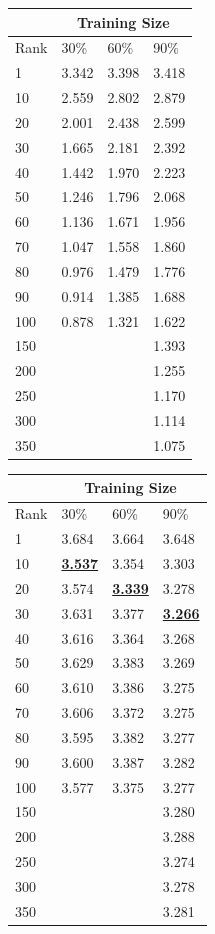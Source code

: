 \documentclass[12pt]{article}
\begin{document}
\begin{center}
        \begin{tabular}{|l || l| l| l|}
          \hline
          &\multicolumn{3}{|c|}{Training Size} \\
          \hline
          Rank & 30\% & 60\% & 90\% \\
          \hline
          1 & 3.342 & 3.398 & 3.418 \\
          10 & 2.559 & 2.802 & 2.879 \\
          20 & 2.001 & 2.438 & 2.599 \\
          30 & 1.665 & 2.181 & 2.392 \\
          40 & 1.442 & 1.970 & 2.223 \\
          50 & 1.246 & 1.796 & 2.068 \\
          60 & 1.136 & 1.671 & 1.956 \\
          70 & 1.047 & 1.558 & 1.860 \\
          80 & 0.976 & 1.479 & 1.776 \\
          90 & 0.914 & 1.385 & 1.688 \\
          100 & 0.878 & 1.321 & 1.622 \\
          150 & & & 1.393 \\
          200 & & & 1.255 \\
          250 & & & 1.170 \\
          300 & & & 1.114 \\
          350 & & & 1.075 \\
          \hline
        \end{tabular}
        \begin{tabular}{|l || l| l| l|}
          \hline
          &\multicolumn{3}{|c|}{Training Size} \\
          \hline
          Rank & 30\% & 60\% & 90\% \\
          \hline
          1   & 3.684 & 3.664 & 3.648 \\
          10  & \underline{\textbf{3.537}} & 3.354 & 3.303 \\
          20  & 3.574 & \underline{\textbf{3.339}} & 3.278 \\
          30  & 3.631 & 3.377 & \underline{\textbf{3.266}} \\
          40  & 3.616 & 3.364 & 3.268 \\
          50  & 3.629 & 3.383 & 3.269 \\
          60  & 3.610 & 3.386 & 3.275 \\
          70  & 3.606 & 3.372 & 3.275 \\
          80  & 3.595 & 3.382 & 3.277 \\
          90  & 3.600 & 3.387 & 3.282 \\
          100 & 3.577 & 3.375 & 3.277 \\
          150 & & & 3.280 \\
          200 & & & 3.288 \\
          250 & & & 3.274 \\
          300 & & & 3.278 \\
          350 & & & 3.281 \\
          \hline
        \end{tabular}


\end{center}
\end{document}
